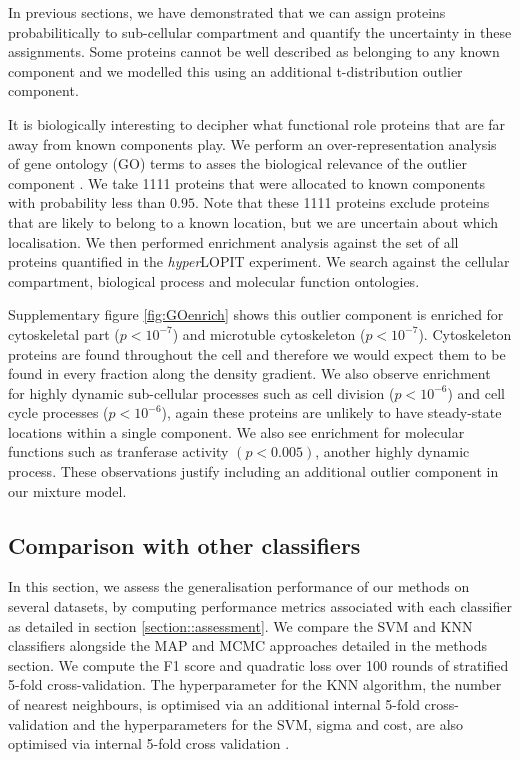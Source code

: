 \documentclass[12pt,english]{article}\usepackage[]{graphicx}\usepackage[]{color}
\begin{document}
In previous sections, we have demonstrated that we can assign proteins
probabilitically to sub-cellular compartment and quantify the
uncertainty in these assignments. Some proteins cannot be well
described as belonging to any known component and we modelled this
using an additional t-distribution outlier component.

It is biologically interesting to decipher what functional role
proteins that are far away from known components play. We perform an
over-representation analysis of gene ontology (GO) terms to asses the
biological relevance of the outlier component \citep{Boyle:2004,
  Yu:2012}. We take 1111 proteins that were allocated to known
components with probability less than $0.95$.  Note that these 1111
proteins exclude proteins that are likely to belong to a known
location, but we are uncertain about which localisation.  We then
performed enrichment analysis against the set of all proteins
quantified in the \textit{hyper}LOPIT experiment. We search against
the cellular compartment, biological process and molecular function
ontologies.

Supplementary figure \ref{fig:GOenrich} shows this outlier component
is enriched for cytoskeletal part ($p <10^{-7}$) and microtuble
cytoskeleton ($p <10^{-7}$). Cytoskeleton proteins are found
throughout the cell and therefore we would expect them to be found in
every fraction along the density gradient. We also observe enrichment
for highly dynamic sub-cellular processes such as cell division
($p <10^{-6}$) and cell cycle processes ($p <10^{-6}$), again these
proteins are unlikely to have steady-state locations within a single
component. We also see enrichment for molecular functions such as
tranferase activity $(p < 0.005)$, another highly dynamic
process. These observations justify including an additional outlier
component in our mixture model.


\clearpage

\subsection{Comparison with other classifiers}

In this section, we assess the generalisation performance of our
methods on several datasets, by computing performance metrics
associated with each classifier as detailed in section
\ref{section::assessment}. We compare the SVM and KNN classifiers
alongside the MAP and MCMC approaches detailed in the methods
section. We compute the F1 score and quadratic loss over 100 rounds of
stratified 5-fold cross-validation. The hyperparameter for the KNN
algorithm, the number of nearest neighbours, is optimised via an
additional internal 5-fold cross-validation and the hyperparameters
for the SVM, sigma and cost, are also optimised via internal 5-fold
cross validation \citep{svm:2010}.
\end{document}
